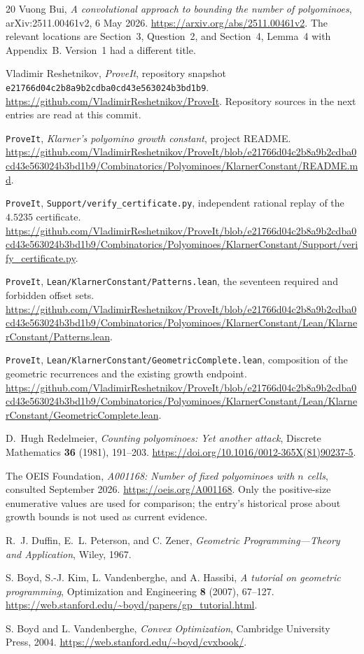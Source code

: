 \documentclass[11pt,a4paper]{article}
\theoremstyle{definition}
\theoremstyle{remark}
\newcommand{\repo}{\texttt{ProveIt}}
\newcommand{\sha}{\texttt{e21766d04c2b8a9b2cdba0cd43e563024b3bd1b9}}
\begin{document}
\clearpage
\begin{thebibliography}{20}
\small
{}
Vuong Bui, \emph{A convolutional approach to bounding the number of
polyominoes}, arXiv:2511.00461v2, 6 May 2026.
\url{https://arxiv.org/abs/2511.00461v2}.
The relevant locations are Section~3, Question~2, and Section~4,
Lemma~4 with Appendix~B. Version~1 had a different title.

Vladimir Reshetnikov, \emph{ProveIt}, repository snapshot
\sha.
\url{https://github.com/VladimirReshetnikov/ProveIt}.
Repository sources in the next entries are read at this commit.

\repo, \emph{Klarner's polyomino growth constant}, project README.
\url{https://github.com/VladimirReshetnikov/ProveIt/blob/e21766d04c2b8a9b2cdba0cd43e563024b3bd1b9/Combinatorics/Polyominoes/KlarnerConstant/README.md}.

\repo, \texttt{Support/verify\_certificate.py}, independent rational replay
of the $4.5235$ certificate.
\url{https://github.com/VladimirReshetnikov/ProveIt/blob/e21766d04c2b8a9b2cdba0cd43e563024b3bd1b9/Combinatorics/Polyominoes/KlarnerConstant/Support/verify_certificate.py}.

\repo, \texttt{Lean/KlarnerConstant/Patterns.lean}, the seventeen required
and forbidden offset sets.
\url{https://github.com/VladimirReshetnikov/ProveIt/blob/e21766d04c2b8a9b2cdba0cd43e563024b3bd1b9/Combinatorics/Polyominoes/KlarnerConstant/Lean/KlarnerConstant/Patterns.lean}.

\repo, \texttt{Lean/KlarnerConstant/GeometricComplete.lean}, composition of
the geometric recurrences and the existing growth endpoint.
\url{https://github.com/VladimirReshetnikov/ProveIt/blob/e21766d04c2b8a9b2cdba0cd43e563024b3bd1b9/Combinatorics/Polyominoes/KlarnerConstant/Lean/KlarnerConstant/GeometricComplete.lean}.

D.~Hugh Redelmeier, \emph{Counting polyominoes: Yet another attack},
Discrete Mathematics \textbf{36} (1981), 191--203.
\url{https://doi.org/10.1016/0012-365X(81)90237-5}.

The OEIS Foundation, \emph{A001168: Number of fixed polyominoes with $n$
cells}, consulted September 2026.
\url{https://oeis.org/A001168}.
Only the positive-size enumerative values are used for comparison; the
entry's historical prose about growth bounds is not used as current evidence.

R.~J. Duffin, E.~L. Peterson, and C. Zener,
\emph{Geometric Programming---Theory and Application}, Wiley, 1967.

S. Boyd, S.-J. Kim, L. Vandenberghe, and A. Hassibi,
\emph{A tutorial on geometric programming}, Optimization and Engineering
\textbf{8} (2007), 67--127.
\url{https://web.stanford.edu/~boyd/papers/gp_tutorial.html}.

S. Boyd and L. Vandenberghe, \emph{Convex Optimization},
Cambridge University Press, 2004.
\url{https://web.stanford.edu/~boyd/cvxbook/}.
\end{thebibliography}
\end{document}
